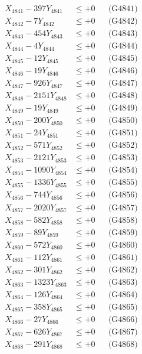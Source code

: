 \documentclass[a4paper,10pt]{article}
\begin{document}
{\begin{align}
\allowbreak
X_{4841} - 397Y_{4841} &\leq +0 && \text{(G4841)} \\
X_{4842} - 7Y_{4842} &\leq +0 && \text{(G4842)} \\
X_{4843} - 454Y_{4843} &\leq +0 && \text{(G4843)} \\
X_{4844} - 4Y_{4844} &\leq +0 && \text{(G4844)} \\
X_{4845} - 12Y_{4845} &\leq +0 && \text{(G4845)} \\
X_{4846} - 19Y_{4846} &\leq +0 && \text{(G4846)} \\
X_{4847} - 926Y_{4847} &\leq +0 && \text{(G4847)} \\
X_{4848} - 2151Y_{4848} &\leq +0 && \text{(G4848)} \\
X_{4849} - 19Y_{4849} &\leq +0 && \text{(G4849)} \\
X_{4850} - 200Y_{4850} &\leq +0 && \text{(G4850)} \\
\allowbreak
X_{4851} - 24Y_{4851} &\leq +0 && \text{(G4851)} \\
X_{4852} - 571Y_{4852} &\leq +0 && \text{(G4852)} \\
X_{4853} - 2121Y_{4853} &\leq +0 && \text{(G4853)} \\
X_{4854} - 1090Y_{4854} &\leq +0 && \text{(G4854)} \\
X_{4855} - 1336Y_{4855} &\leq +0 && \text{(G4855)} \\
X_{4856} - 744Y_{4856} &\leq +0 && \text{(G4856)} \\
X_{4857} - 2020Y_{4857} &\leq +0 && \text{(G4857)} \\
X_{4858} - 582Y_{4858} &\leq +0 && \text{(G4858)} \\
X_{4859} - 89Y_{4859} &\leq +0 && \text{(G4859)} \\
X_{4860} - 572Y_{4860} &\leq +0 && \text{(G4860)} \\
\allowbreak
X_{4861} - 112Y_{4861} &\leq +0 && \text{(G4861)} \\
X_{4862} - 301Y_{4862} &\leq +0 && \text{(G4862)} \\
X_{4863} - 1323Y_{4863} &\leq +0 && \text{(G4863)} \\
X_{4864} - 126Y_{4864} &\leq +0 && \text{(G4864)} \\
X_{4865} - 358Y_{4865} &\leq +0 && \text{(G4865)} \\
X_{4866} - 27Y_{4866} &\leq +0 && \text{(G4866)} \\
X_{4867} - 626Y_{4867} &\leq +0 && \text{(G4867)} \\
X_{4868} - 291Y_{4868} &\leq +0 && \text{(G4868)} \\

\end{align}}
\end{document}
